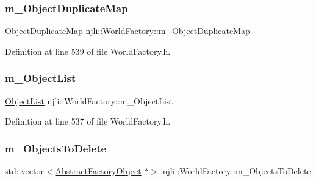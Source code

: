 \subsubsection{\texorpdfstring{m\+\_\+\+Object\+Duplicate\+Map}{m\_ObjectDuplicateMap}}
{\footnotesize\ttfamily \mbox{\hyperlink{classnjli_1_1_world_factory_a15eec8c4710c8ec66e7cd06dd2327be6}{Object\+Duplicate\+Map}} njli\+::\+World\+Factory\+::m\+\_\+\+Object\+Duplicate\+Map\hspace{0.3cm}{\ttfamily [private]}}



Definition at line 539 of file World\+Factory.\+h.

\mbox{\label{classnjli_1_1_world_factory_ad8c7adb588d481784128249f971d0bde}} 
\subsubsection{\texorpdfstring{m\+\_\+\+Object\+List}{m\_ObjectList}}
{\footnotesize\ttfamily \mbox{\hyperlink{classnjli_1_1_world_factory_a987ddbccec6101d2a0ca72f9ecfc0249}{Object\+List}} njli\+::\+World\+Factory\+::m\+\_\+\+Object\+List\hspace{0.3cm}{\ttfamily [private]}}



Definition at line 537 of file World\+Factory.\+h.

\mbox{\label{classnjli_1_1_world_factory_ad703b2808e6be7e94ba5b61211c949c1}} 
\subsubsection{\texorpdfstring{m\+\_\+\+Objects\+To\+Delete}{m\_ObjectsToDelete}}
{\footnotesize\ttfamily std\+::vector$<$\mbox{\hyperlink{classnjli_1_1_abstract_factory_object}{Abstract\+Factory\+Object}} $\ast$$>$ njli\+::\+World\+Factory\+::m\+\_\+\+Objects\+To\+Delete\hspace{0.3cm}{\ttfamily [private]}}



